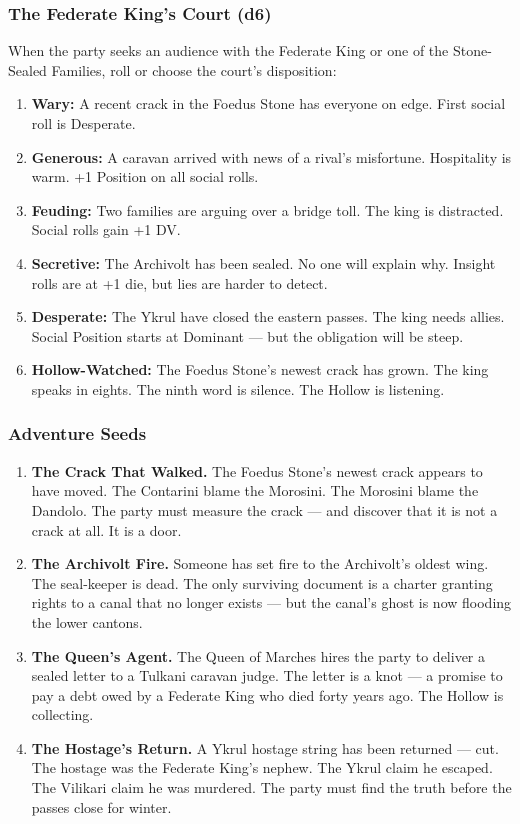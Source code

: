 \subsubsection*{The Federate King's Court (d6)}

When the party seeks an audience with the Federate King or one of the Stone-Sealed Families, roll or choose the court's disposition:
\begin{enumerate}
    \item \textbf{Wary:} A recent crack in the Foedus Stone has everyone on edge. First social roll is Desperate.
    \item \textbf{Generous:} A caravan arrived with news of a rival's misfortune. Hospitality is warm. +1 Position on all social rolls.
    \item \textbf{Feuding:} Two families are arguing over a bridge toll. The king is distracted. Social rolls gain +1 DV.
    \item \textbf{Secretive:} The Archivolt has been sealed. No one will explain why. Insight rolls are at +1 die, but lies are harder to detect.
    \item \textbf{Desperate:} The Ykrul have closed the eastern passes. The king needs allies. Social Position starts at Dominant --- but the obligation will be steep.
    \item \textbf{Hollow-Watched:} The Foedus Stone's newest crack has grown. The king speaks in eights. The ninth word is silence. The Hollow is listening.
\end{enumerate}

\subsubsection*{Adventure Seeds}

\begin{enumerate}
    \item \textbf{The Crack That Walked.} The Foedus Stone's newest crack appears to have moved. The Contarini blame the Morosini. The Morosini blame the Dandolo. The party must measure the crack --- and discover that it is not a crack at all. It is a door.
    \item \textbf{The Archivolt Fire.} Someone has set fire to the Archivolt's oldest wing. The seal-keeper is dead. The only surviving document is a charter granting rights to a canal that no longer exists --- but the canal's ghost is now flooding the lower cantons.
    \item \textbf{The Queen's Agent.} The Queen of Marches hires the party to deliver a sealed letter to a Tulkani caravan judge. The letter is a knot --- a promise to pay a debt owed by a Federate King who died forty years ago. The Hollow is collecting.
    \item \textbf{The Hostage's Return.} A Ykrul hostage string has been returned --- cut. The hostage was the Federate King's nephew. The Ykrul claim he escaped. The Vilikari claim he was murdered. The party must find the truth before the passes close for winter.
\end{enumerate}

